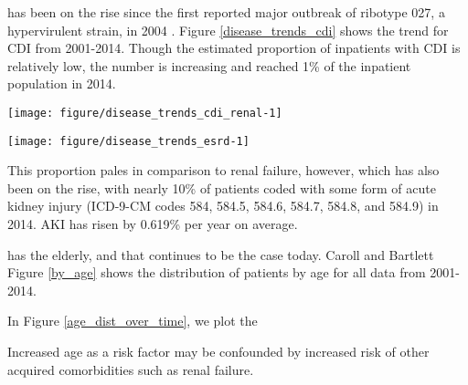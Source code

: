 
\cdiff has been on the rise since the first reported major outbreak of ribotype 027, a hypervirulent strain, in 2004 \cite{Pepin2004}. 
Figure \ref{disease_trends_cdi} shows the trend for CDI from 2001-2014. Though the estimated proportion of inpatients with CDI is 
relatively low, the number is increasing and reached 1\% of the inpatient population in 2014. 

\begin{knitrout}
\color{fgcolor}
\texttt{[image: figure/disease\_trends\_cdi\_renal-1]} 

\end{knitrout}



\begin{knitrout}
\color{fgcolor}\begin{kframe}


{\ttfamily\noindent\itshape\color{messagecolor}{\#\# Parsed with column specification:\\\#\# cols(\\\#\#\ \  age = col\_integer(),\\\#\#\ \  nis\_year = col\_integer(),\\\#\#\ \  discwt = col\_double()\\\#\# )}}\end{kframe}
\texttt{[image: figure/disease\_trends\_esrd-1]} 

\end{knitrout}

This proportion pales in comparison to renal failure, however, which has also been on the rise, with nearly 10\% of patients coded with
some form of acute kidney injury (ICD-9-CM codes 584, 584.5, 584.6, 584.7, 584.8, and 584.9) in 2014. AKI has risen 
by 0.619\% per year on average.


has  the elderly, and that continues to be the case today. Caroll and Bartlett \cite{Carroll2011}
Figure \ref{by_age} shows the distribution of \cdiff patients by age for all data from 2001-2014. 
\cite{Masgala2014}


In Figure \ref{age_dist_over_time}, we plot the



Increased age as a risk factor may be confounded by increased risk of other acquired comorbidities such as renal failure. 
\cite{Krapohl2013} \cite{Masgala2014}

